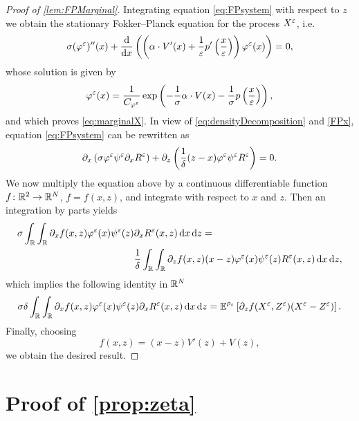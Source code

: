\documentclass[review,onefignum,onetabnum]{siamonline190516}
\begin{document}
\begin{appendices}
\begin{proof}[Proof of \cref{lem:FPMarginal}] Integrating equation \eqref{eq:FPsystem} with respect to $z$ we obtain the stationary Fokker--Planck equation for the process $X^\varepsilon$, i.e.
	\begin{equation}
	\label{FPx}
	\sigma (\phi^\epl)''(x) + \frac{\d}{\d x} \left( \left ( \alpha \cdot V'(x) + \frac{1}{\epl} p' \left ( \frac{x}\epl \right ) \right ) \phi^\epl(x)\right) = 0,
	\end{equation}
	whose solution is given by
	\begin{equation}
	\varphi^\varepsilon(x) = \frac{1}{C_{\varphi^\varepsilon}} \exp\left(- \frac{1}{\sigma} \alpha \cdot V(x) - \frac{1}{\sigma} p \left ( \frac{x}{\varepsilon} \right )\right),
	\end{equation}
	and which proves \eqref{eq:marginalX}. In view of \eqref{eq:densityDecomposition} and \eqref{FPx}, equation \eqref{eq:FPsystem} can be rewritten as
	\begin{equation}\label{eq:psiEqualityPDE}
	\partial_x \left( \sigma \phi^\epl \psi^\epl \partial_x R^\epl \right) + \partial_z \left( \frac1\delta(z-x) \phi^\epl \psi^\epl R^\epl \right) = 0.
	\end{equation}
	We now multiply the equation above by a continuous differentiable function $f \colon \mathbb{R}^2 \to \mathbb{R}^N$, $f = f(x,z)$, and integrate with respect to $x$ and $z$. Then an integration by parts yields
	\begin{equation}
	\begin{aligned}
	\sigma \int_{\mathbb{R}} \int_{\mathbb{R}} \partial_x f(x,z) \varphi^\varepsilon(x) \psi^\varepsilon(z) &\partial_x R^\varepsilon(x,z) \,\mathrm{d} x \,\mathrm{d} z = \\
	&\frac1\delta \int_{\mathbb{R}} \int_{\mathbb{R}} \partial_z f(x,z) (x-z) \varphi^\varepsilon(x) \psi^\varepsilon(z) R^\varepsilon(x,z) \,\mathrm{d} x \,\mathrm{d} z,
	\end{aligned}
	\end{equation}
	which implies the following identity in $\mathbb{R}^N$
	\begin{equation}
	\sigma \delta \int_{\mathbb{R}} \int_{\mathbb{R}} \partial_x f(x,z) \varphi^\varepsilon(x) \psi^\varepsilon(z) \partial_x R^\varepsilon(x,z) \,\mathrm{d} x \,\mathrm{d} z = \operatorname{\mathbb{E}}^{\rho_\varepsilon} \left[ \partial_z f(X^\varepsilon,Z^\varepsilon) (X^\varepsilon-Z^\varepsilon) \right].
	\end{equation}
	Finally, choosing 
	\begin{equation}
	f(x,z) = (x - z) V'(z) + V(z),
	\end{equation}
	we obtain the desired result.
\end{proof}

\section{Proof of \cref{prop:zeta}}\label{ap:ProofDistance}


\end{appendices}
\end{document}
